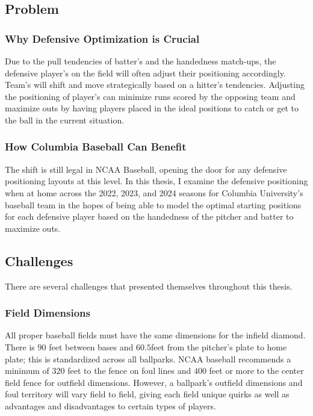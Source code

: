 \documentclass{article}
\begin{document}
\newpage
\subsection{Problem}
\subsubsection{Why Defensive Optimization is Crucial}
Due to the pull tendencies of batter's and the handedness match-ups, the defensive player's on the field will often adjust their positioning accordingly. Team's will shift and move strategically based on a hitter's tendencies. Adjusting the positioning of player's can minimize runs scored by the opposing team and maximize outs by having players placed in the ideal positions to catch or get to the ball in the current situation. \cite{yanksgoyard2022galloargument} \cite{mlbsavant2023gallobatterpositioning} \cite{fangraphs2023gallo} \cite{mlbsavant2023gallo} \cite{yahoo2023galloescape} \cite{mlb2023pillardefense}
\cite{mlb2023goldglove} 

\subsubsection{How Columbia Baseball Can Benefit}
The shift is still legal in NCAA Baseball, opening the door for any defensive positioning layouts at this level. In this thesis, I examine the defensive positioning when at home across the 2022, 2023, and 2024 seasons for Columbia University's baseball team in the hopes of being able to model the optimal starting positions for each defensive player based on the handedness of the pitcher and batter to maximize outs. \cite{baseballamerica2023shiftban}

\subsection{Challenges}

There are several challenges that presented themselves throughout this thesis. 

\subsubsection{Field Dimensions}
All proper baseball fields must have the same dimensions for the infield diamond. There is $90$ feet between bases and $60.5 $feet from the pitcher's plate to home plate; this is standardized across all ballparks. NCAA baseball recommends a minimum of 320 feet to the fence on foul lines and $400$ feet or more to the center field fence for outfield dimensions. However, a ballpark's outfield dimensions and foul territory will vary field to field, giving each field unique quirks as well as advantages and disadvantages to certain types of players. \cite{mlb2023fielddimensions}
\end{document}
